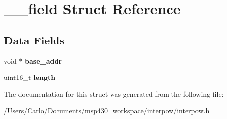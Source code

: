 \hypertarget{struct____field}{}\section{\+\_\+\+\_\+field Struct Reference}
\label{struct____field}
\subsection*{Data Fields}
\begin{DoxyCompactItemize}
\item 
\mbox{\label{struct____field_a11629c26d97d432db05d9355c37362d7}} 
void $\ast$ {\bfseries base\+\_\+addr}
\item 
\mbox{\label{struct____field_a1892eba2086d12ac2b09005aeb09ea3b}} 
uint16\+\_\+t {\bfseries length}
\end{DoxyCompactItemize}


The documentation for this struct was generated from the following file\+:\begin{DoxyCompactItemize}
\item 
/\+Users/\+Carlo/\+Documents/msp430\+\_\+workspace/interpow/interpow.\+h\end{DoxyCompactItemize}
